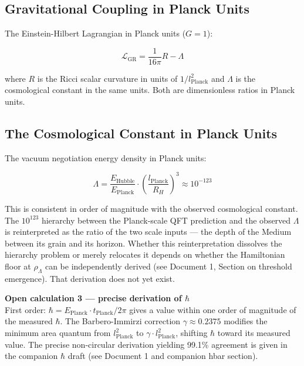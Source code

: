 \documentclass[11pt,letterpaper]{article}
\newenvironment{openbox}{\begin{tcolorbox}[colback=orange!5!white,colframe=orange!60!black,title={\small\textit{Open calculation}},breakable]}{\end{tcolorbox}}
\begin{document}
\subsection{Gravitational Coupling in Planck Units}
\label{sec:orgb221a3b}

The Einstein-Hilbert Lagrangian in Planck units (\(G = 1\)):

\begin{equation}
\mathcal{L}_\text{GR} = \frac{1}{16\pi} R - \Lambda
\end{equation}

where \(R\) is the Ricci scalar curvature in units of \(1/l_\text{Planck}^2\) and \(\Lambda\) is the cosmological constant in the same units. Both are dimensionless ratios in Planck units.

\subsection{The Cosmological Constant in Planck Units}
\label{sec:org08726e6}

The vacuum negotiation energy density in Planck units:

\begin{equation}
\Lambda = \frac{E_\text{Hubble}}{E_\text{Planck}} \cdot \left(\frac{l_\text{Planck}}{R_H}\right)^3 \approx 10^{-123}
\end{equation}

This is consistent in order of magnitude with the observed cosmological constant. The \(10^{123}\) hierarchy between the Planck-scale QFT prediction and the observed \(\Lambda\) is reinterpreted as the ratio of the two scale inputs --- the depth of the Medium between its grain and its horizon. Whether this reinterpretation dissolves the hierarchy problem or merely relocates it depends on whether the Hamiltonian floor at \(\rho_\Lambda\) can be independently derived (see Document 1, Section on threshold emergence). That derivation does not yet exist.

\begin{openbox}
\textbf{Open calculation 3 --- precise derivation of $\hbar$}\\[4pt]
First order: $\hbar = E_\text{Planck} \cdot t_\text{Planck} / 2\pi$ gives a value within one order of magnitude of the measured $\hbar$. The Barbero-Immirzi correction $\gamma \approx 0.2375$ modifies the minimum area quantum from $l_\text{Planck}^2$ to $\gamma \cdot l_\text{Planck}^2$, shifting $\hbar$ toward its measured value. The precise non-circular derivation yielding 99.1\% agreement is given in the companion $\hbar$ draft (see Document 1 and companion hbar section).
\end{openbox}
\end{document}

